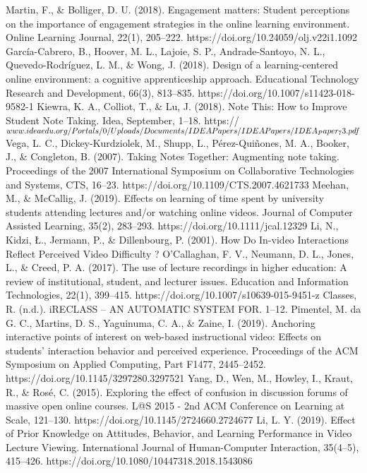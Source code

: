 \documentclass[conference]{IEEEtran}
\begin{document}
\begin{thebibliography}{00}
 Martin, F., \& Bolliger, D. U. (2018). Engagement matters: Student perceptions on the importance of engagement strategies in the online learning environment. Online Learning Journal, 22(1), 205–222. https://doi.org/10.24059/olj.v22i1.1092
 García-Cabrero, B., Hoover, M. L., Lajoie, S. P., Andrade-Santoyo, N. L., Quevedo-Rodríguez, L. M., \& Wong, J. (2018). Design of a learning-centered online environment: a cognitive apprenticeship approach. Educational Technology Research and Development, 66(3), 813–835. https://doi.org/10.1007/s11423-018-9582-1
 Kiewra, K. A., Colliot, T., \& Lu, J. (2018). Note This: How to Improve Student Note Taking. Idea, September, 1–18. https://$ www.ideaedu.org/Portals/0/Uploads/Documents/\\IDEA Papers/IDEA Papers/IDEA_Paper_73.pdf$
 Vega, L. C., Dickey-Kurdziolek, M., Shupp, L., Pérez-Quiñones, M. A., Booker, J., \& Congleton, B. (2007). Taking Notes Together: Augmenting note taking. Proceedings of the 2007 International Symposium on Collaborative Technologies and Systems, CTS, 16–23. https://doi.org/10.1109/CTS.2007.4621733
 Meehan, M., \& McCallig, J. (2019). Effects on learning of time spent by university students attending lectures and/or watching online videos. Journal of Computer Assisted Learning, 35(2), 283–293. https://doi.org/10.1111/jcal.12329
 Li, N., Kidzi, Ł., Jermann, P., \& Dillenbourg, P. (2001). How Do In-video Interactions Reflect Perceived Video Difficulty ?
 O’Callaghan, F. V., Neumann, D. L., Jones, L., \& Creed, P. A. (2017). The use of lecture recordings in higher education: A review of institutional, student, and lecturer issues. Education and Information Technologies, 22(1), 399–415. https://doi.org/10.1007/s10639-015-9451-z
Classes, R. (n.d.). iRECLASS – AN AUTOMATIC SYSTEM FOR. 1–12.
Pimentel, M. da G. C., Martins, D. S., Yaguinuma, C. A., \& Zaine, I. (2019). Anchoring interactive points of interest on web-based instructional video: Effects on students’ interaction behavior and perceived experience. Proceedings of the ACM Symposium on Applied Computing, Part F1477, 2445–2452. https://doi.org/10.1145/3297280.3297521
Yang, D., Wen, M., Howley, I., Kraut, R., \& Rosé, C. (2015). Exploring the effect of confusion in discussion forums of massive open online courses. L@S 2015 - 2nd ACM Conference on Learning at Scale, 121–130. https://doi.org/10.1145/2724660.2724677
Li, L. Y. (2019). Effect of Prior Knowledge on Attitudes, Behavior, and Learning Performance in Video Lecture Viewing. International Journal of Human-Computer Interaction, 35(4–5), 415–426. https://doi.org/10.1080/10447318.2018.1543086

\end{thebibliography}
\end{document}
